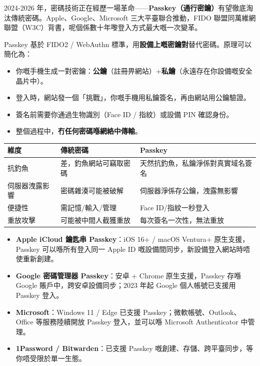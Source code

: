 
2024-2026 年，密碼技術正在經歷一場革命——\textbf{Passkey（通行密鑰）}有望徹底淘汰傳統密碼。Apple、Google、Microsoft 三大平臺聯合推動，FIDO 聯盟同萬維網聯盟（W3C）背書，呢個係數十年嚟登入方式最大嘅一次變革。


Passkey 基於 FIDO2 / WebAuthn 標準，用\textbf{設備上嘅密鑰對}替代密碼。原理可以簡化為：

\begin{itemize}
  \item 你嘅手機生成一對密鑰：\textbf{公鑰}（註冊畀網站）+\textbf{私鑰}（永遠存在你設備嘅安全晶片中）。
  \item 登入時，網站發一個「挑戰」，你嘅手機用私鑰簽名，再由網站用公鑰驗證。
  \item 簽名前需要你通過生物識別（Face ID / 指紋）或設備 PIN 確認身份。
  \item 整個過程中，\textbf{冇任何密碼喺網絡中傳輸}。
\end{itemize}


\begin{center}
\begin{tabularx}{\linewidth}{|X|X|X|}
\hline
\textbf{維度} & \textbf{傳統密碼} & \textbf{Passkey} \tabularnewline
\hline
抗釣魚 & 差，釣魚網站可竊取密碼 & 天然抗釣魚，私鑰淨係對真實域名簽名 \tabularnewline
伺服器洩露影響 & 密碼雜湊可能被破解 & 伺服器淨係存公鑰，洩露無影響 \tabularnewline
便捷性 & 需記憶/輸入/管理 & Face ID/指紋一秒登入 \tabularnewline
重放攻擊 & 可能被中間人截獲重放 & 每次簽名一次性，無法重放 \tabularnewline
\hline
\end{tabularx}
\end{center}


\begin{itemize}
  \item \textbf{Apple iCloud 鑰匙串 Passkey}：iOS 16+ / macOS Ventura+ 原生支援，Passkey 可以喺所有登入同一 Apple ID 嘅設備間同步，新設備登入網站時唔使重新創建。
  \item \textbf{Google 密碼管理器 Passkey}：安卓 + Chrome 原生支援，Passkey 存喺 Google 賬戶中，跨安卓設備同步；2023 年起 Google 個人帳號已支援用 Passkey 登入。
  \item \textbf{Microsoft}：Windows 11 / Edge 已支援 Passkey；微軟帳號、Outlook、Office 等服務陸續開放 Passkey 登入，並可以喺 Microsoft Authenticator 中管理。
  \item \textbf{1Password / Bitwarden}：已支援 Passkey 嘅創建、存儲、跨平臺同步，等你唔受限於單一生態。
\end{itemize}

